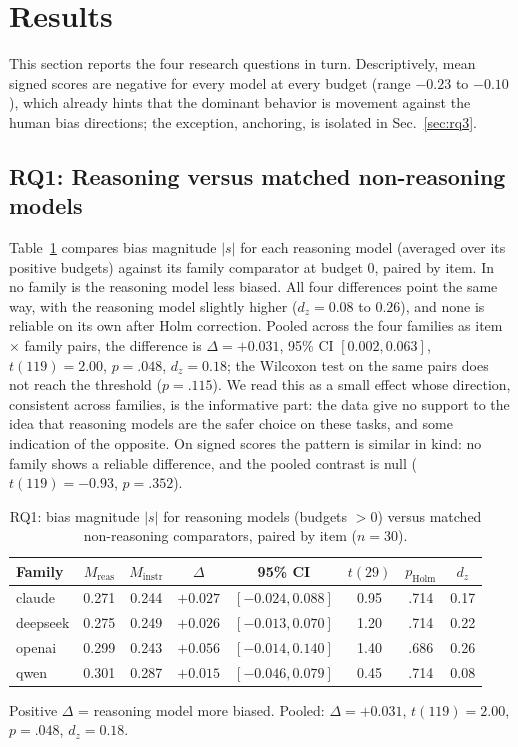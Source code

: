 \documentclass[conference]{IEEEtran}
\begin{document}
\section{Results}

This section reports the four research questions in turn. Descriptively, mean signed scores are negative for every model at every budget (range $-0.23$ to $-0.10$), which already hints that the dominant behavior is movement against the human bias directions; the exception, anchoring, is isolated in Sec.~\ref{sec:rq3}.

\subsection{RQ1: Reasoning versus matched non-reasoning models}
Table~\ref{tab:rq1} compares bias magnitude $|s|$ for each reasoning model (averaged over its positive budgets) against its family comparator at budget 0, paired by item. In no family is the reasoning model less biased. All four differences point the same way, with the reasoning model slightly higher ($d_z = 0.08$ to $0.26$), and none is reliable on its own after Holm correction. Pooled across the four families as item $\times$ family pairs, the difference is $\Delta = +0.031$, 95\% CI $[0.002, 0.063]$, $t(119) = 2.00$, $p = .048$, $d_z = 0.18$; the Wilcoxon test on the same pairs does not reach the threshold ($p = .115$). We read this as a small effect whose direction, consistent across families, is the informative part: the data give no support to the idea that reasoning models are the safer choice on these tasks, and some indication of the opposite. On signed scores the pattern is similar in kind: no family shows a reliable difference, and the pooled contrast is null ($t(119) = -0.93$, $p = .352$).

\begin{table}[t]
\centering
\caption{RQ1: bias magnitude $|s|$ for reasoning models (budgets $>0$) versus matched non-reasoning comparators, paired by item ($n=30$).}
\label{tab:rq1}
\footnotesize
\setlength{\tabcolsep}{2.6pt}
\begin{tabular}{lccccccc}
\hline
Family & $M_{\text{reas}}$ & $M_{\text{instr}}$ & $\Delta$ & 95\% CI & $t(29)$ & $p_{\text{Holm}}$ & $d_z$ \\
\hline
claude   & 0.271 & 0.244 & $+0.027$ & $[-0.024, 0.088]$ & 0.95 & .714 & 0.17 \\
deepseek & 0.275 & 0.249 & $+0.026$ & $[-0.013, 0.070]$ & 1.20 & .714 & 0.22 \\
openai   & 0.299 & 0.243 & $+0.056$ & $[-0.014, 0.140]$ & 1.40 & .686 & 0.26 \\
qwen     & 0.301 & 0.287 & $+0.015$ & $[-0.046, 0.079]$ & 0.45 & .714 & 0.08 \\
\hline
\end{tabular}
\par\smallskip\footnotesize Positive $\Delta$ = reasoning model more biased. Pooled: $\Delta = +0.031$, $t(119)=2.00$, $p=.048$, $d_z=0.18$.
\end{table}
\end{document}
